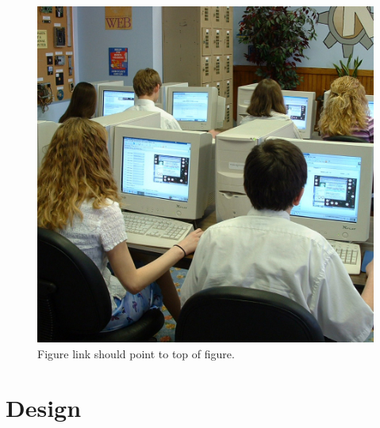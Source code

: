 \documentclass[final,10pt]{../../uit-thesis}
\begin{document}
\begin{figure}\label{fig:ex}
\centering
\includegraphics[scale=0.1]{748443511_095ae916df_o.jpg}
\caption{Figure link should point to top of figure.}
\end{figure}

\chapter{Design}
\lipsum[8-10]

\backmatter
\end{document}
